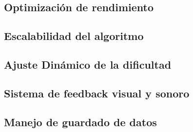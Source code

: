 \subsection{Optimización de rendimiento}

\subsection{Escalabilidad del algoritmo}


\subsection{Ajuste Dinámico de la dificultad}

\subsection{Sistema de feedback visual y sonoro}

\subsection{Manejo de guardado de datos}

